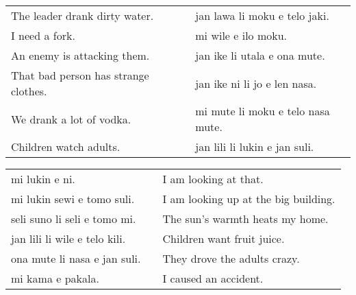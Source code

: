 \begin{supertabular}{p{5,5cm}|ll}
    The leader drank dirty water.        &  & jan lawa li moku e telo jaki.     \\ %
    I need a fork.                       &  & mi wile e ilo moku.               \\ %
    An enemy is attacking them.          &  & jan ike li utala e ona mute.      \\ %
    That bad person has strange clothes. &  & jan ike ni li jo e len nasa.      \\ %
    We drank a lot of vodka.             &  & mi mute li moku e telo nasa mute. \\ %
    Children watch adults.               &  & jan lili li lukin e jan suli.     \\ %
\end{supertabular}

\begin{supertabular}{p{5,5cm}|ll}
    mi lukin e ni.                &  & I am looking at that.                \\
    mi lukin sewi e tomo suli.    &  & I am looking up at the big building. \\
    seli suno li seli e tomo mi.  &  & The sun's warmth heats my home.      \\
    jan lili li wile e telo kili. &  & Children want fruit juice.           \\
    ona mute li nasa e jan suli.  &  & They drove the adults crazy.         \\
    mi kama e pakala.             &  & I caused an accident.                \\
\end{supertabular}

\newpage
%
